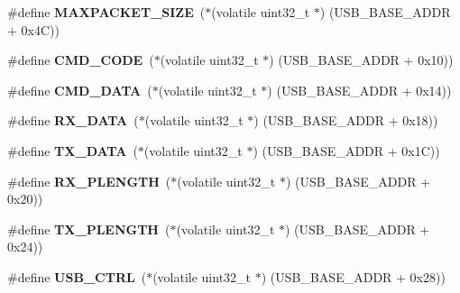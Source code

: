 \begin{DoxyCompactItemize}
\item 
\mbox{\label{group__lpc24xx__regs_ga23ce8dbb5cc493bb188afa039ed966d6}} 
\#define {\bfseries M\+A\+X\+P\+A\+C\+K\+E\+T\+\_\+\+S\+I\+ZE}~($\ast$(volatile uint32\+\_\+t $\ast$) (U\+S\+B\+\_\+\+B\+A\+S\+E\+\_\+\+A\+D\+DR + 0x4\+C))
\item 
\mbox{\label{group__lpc24xx__regs_ga26004032d7c8d515ace0a9d0b335803a}} 
\#define {\bfseries C\+M\+D\+\_\+\+C\+O\+DE}~($\ast$(volatile uint32\+\_\+t $\ast$) (U\+S\+B\+\_\+\+B\+A\+S\+E\+\_\+\+A\+D\+DR + 0x10))
\item 
\mbox{\label{group__lpc24xx__regs_ga472710fa35c93cfacb7937657acfb7bd}} 
\#define {\bfseries C\+M\+D\+\_\+\+D\+A\+TA}~($\ast$(volatile uint32\+\_\+t $\ast$) (U\+S\+B\+\_\+\+B\+A\+S\+E\+\_\+\+A\+D\+DR + 0x14))
\item 
\mbox{\label{group__lpc24xx__regs_ga90b21c450cfc5c88ba50c5049177f0d2}} 
\#define {\bfseries R\+X\+\_\+\+D\+A\+TA}~($\ast$(volatile uint32\+\_\+t $\ast$) (U\+S\+B\+\_\+\+B\+A\+S\+E\+\_\+\+A\+D\+DR + 0x18))
\item 
\mbox{\label{group__lpc24xx__regs_gab7aa78c51c5c51bbfd493bf42bef0de3}} 
\#define {\bfseries T\+X\+\_\+\+D\+A\+TA}~($\ast$(volatile uint32\+\_\+t $\ast$) (U\+S\+B\+\_\+\+B\+A\+S\+E\+\_\+\+A\+D\+DR + 0x1\+C))
\item 
\mbox{\label{group__lpc24xx__regs_gae668ee95fe0745255f5bfa0308c8b3db}} 
\#define {\bfseries R\+X\+\_\+\+P\+L\+E\+N\+G\+TH}~($\ast$(volatile uint32\+\_\+t $\ast$) (U\+S\+B\+\_\+\+B\+A\+S\+E\+\_\+\+A\+D\+DR + 0x20))
\item 
\mbox{\label{group__lpc24xx__regs_ga63a2a022475066b0ae072996c5056e4b}} 
\#define {\bfseries T\+X\+\_\+\+P\+L\+E\+N\+G\+TH}~($\ast$(volatile uint32\+\_\+t $\ast$) (U\+S\+B\+\_\+\+B\+A\+S\+E\+\_\+\+A\+D\+DR + 0x24))
\item 
\mbox{\label{group__lpc24xx__regs_gab7bdc25df3717d2745df3eebec6fad57}} 
\#define {\bfseries U\+S\+B\+\_\+\+C\+T\+RL}~($\ast$(volatile uint32\+\_\+t $\ast$) (U\+S\+B\+\_\+\+B\+A\+S\+E\+\_\+\+A\+D\+DR + 0x28))

\end{DoxyCompactItemize}
